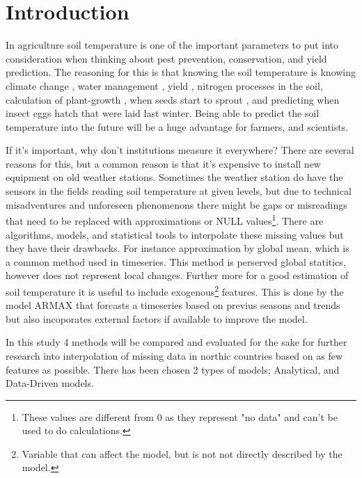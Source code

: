 \section{Introduction}

In agriculture soil temperature is one of the important parameters to put into consideration when thinking about pest prevention, conservation, and yield prediction. The reasoning for this is that knowing the soil temperature is knowing climate change \cite{li_attention-aware_2022}, water management \cite{alizamir_advanced_2020}, yield \cite{sim_prediction_2020}, nitrogen processes \cite{rankinen_simple_2004} in the soil, calculation of plant-growth \cite{li_modeling_2020}, when seeds start to sprout \cite{li_modeling_2020}, and predicting when insect eggs hatch that were laid last winter. Being able to predict the soil temperature into the future will be a huge advantage for farmers, and scientists.

If it's important, why don't institutions measure it everywhere? There are several reasons for this, but a common reason is that it's expensive to install new equipment on old weather stations. Sometimes the weather station do have the sensors in the fields reading soil temperature at given levels, but due to technical misadventures and unforeseen phenomenons there might be gaps or misreadings that need to be replaced with approximations or NULL values\footnote{These values are different from 0 as they represent "no data" and can't be used to do calculations.}. There are algorithms, models, and statistical tools to interpolate these missing values but they have their drawbacks. For instance approximation by global mean, which is a common method used in timeseries\cite{lepot_interpolation_2017}. This method is perserved global statitics, however does not represent local changes. Further more for a good estimation of soil temperature it is useful to include exogenous\footnote{Variable that can affect the model, but is not not directly described by the model.} features. This is done by the model ARMAX that forcasts a timeseries based on previus seasons and trends but also incoporates external factors if available to improve the model. 

In this study 4 methods will be compared and evaluated for the sake for further research into interpolation of missing data in northic countries based on as few features as possible. There has been chosen 2 types of models; Analytical, and Data-Driven models. 